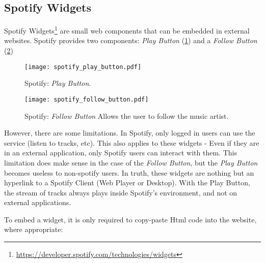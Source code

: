 

    \subsection{Spotify Widgets} %
    \label{sub:spotify_widgets}

      Spotify Widgets\footnote{\url{https://developer.spotify.com/technologies/widgets}} are small web components that can be embedded in external websites.
      Spotify provides two components: \emph{Play Button} (\ref{fig:spotify_play_button}) and a \emph{Follow Button} (\ref{fig:spotify_follow_button})

      \begin{figure}[H]
        \begin{center}
          \texttt{[image: spotify\_play\_button.pdf]}
        \end{center}
        \caption{Spotify: \emph{Play Button}.}
        \label{fig:spotify_play_button}
      \end{figure}

      \begin{figure}[H]
        \begin{center}
          \texttt{[image: spotify\_follow\_button.pdf]}
        \end{center}
        \caption{Spotify: \emph{Follow Button} Allows the user to follow the music artist.}
        \label{fig:spotify_follow_button}
      \end{figure}

      However, there are some limitations.
      In Spotify, only logged in users can use the service (listen to tracks, etc).
      This also applies to these widgets - Even if they are in an external application, only Spotify users can interact with them.
      This limitation does make sense in the case of the \emph{Follow Button}, but the \emph{Play Button} becomes useless to non-spotify users.
      In truth, these widgets are nothing but an hyperlink to a Spotify Client (Web Player or Desktop).
      With the Play Button, the stream of tracks always plays inside Spotify's environment, and not on external applications.

      To embed a widget, it is only required to copy-paste Html code into the website, where appropriate:

      

